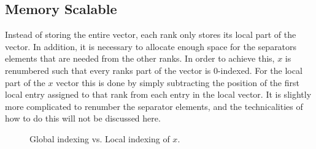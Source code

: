 \subsection{Memory Scalable}
Instead of storing the entire vector, each rank only stores its local part of the vector. In addition, it is necessary to allocate enough space for the separators elements that are needed from the other ranks. In order to achieve this, \(x\) is renumbered such that every ranks part of the vector is 0-indexed. For the local part of the \(x\) vector this is done by simply subtracting the position of the first local entry assigned to that rank from each entry in the local vector. It is slightly more complicated to renumber the separator elements, and the technicalities of how to do this will not be discussed here.

\begin{figure}[ht]
    \centering
    \caption{Global indexing vs. Local indexing of \(x\).}
    \label{fig:2dcomm}
\end{figure}




